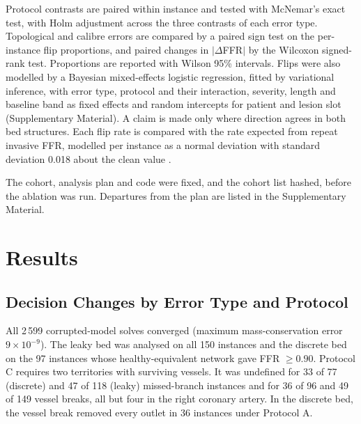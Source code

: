 \documentclass[journal]{IEEEtran}
\begin{document}
Protocol contrasts are paired within instance and tested with McNemar's exact test, with Holm adjustment across the
three contrasts of each error type. Topological and calibre errors are compared by a paired sign test on the
per-instance flip proportions, and paired changes in $|\Delta$FFR$|$ by the Wilcoxon signed-rank test. Proportions
are reported with Wilson 95\% intervals. Flips were also modelled by a Bayesian mixed-effects logistic regression,
fitted by variational inference, with error type, protocol and their interaction, severity, length and baseline band
as fixed effects and random intercepts for patient and lesion slot (Supplementary Material). A claim is made only
where direction agrees in both bed structures. Each flip rate is compared with the rate expected from repeat
invasive FFR, modelled per instance as a normal deviation with standard deviation 0.018 about the clean value
\cite{johnson2015,petraco2013}.

The cohort, analysis plan and code were fixed, and the cohort list hashed, before the ablation was run. Departures
from the plan are listed in the Supplementary Material.

\section{Results}
\subsection{Decision Changes by Error Type and Protocol}
All 2\,599 corrupted-model solves converged (maximum mass-conservation error $9\times10^{-9}$). The leaky bed was
analysed on all 150 instances and the discrete bed on the 97 instances whose healthy-equivalent network gave
FFR $\geq 0.90$. Protocol C requires two territories with surviving vessels. It was undefined for 33 of 77 (discrete)
and 47 of 118 (leaky) missed-branch instances and for 36 of 96 and 49 of 149 vessel breaks, all but four in the
right coronary artery. In the discrete bed, the vessel break removed every outlet in 36 instances under Protocol A.
\end{document}

